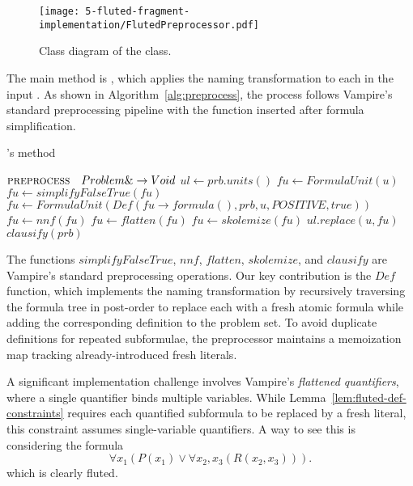 \begin{figure}[H]
  \centering
  \texttt{[image: 5-fluted-fragment-implementation/FlutedPreprocessor.pdf]}
  \caption{Class diagram of the  class.}\label{fig:fluted-preprocessor-class-diagram}
\end{figure}

The main method is , which applies the naming transformation to each  in the input .
As shown in Algorithm~\ref{alg:preprocess}, the process follows Vampire's standard preprocessing pipeline with the  function inserted after formula simplification.

\begin{algorithm}[H]
    \caption{'s  method}\label{alg:preprocess}
    \begin{algorithmic}[1]
        \Statex{}  \(\textsc{preprocess} \quad Problem\& \to Void\)
            \State{} \(ul \gets prb.units()\)
              \State{} \(fu \gets FormulaUnit(u)\)
              \State{} \(fu \gets simplifyFalseTrue(fu)\)
              \State{} \(fu \gets FormulaUnit(Def(fu\to formula(),prb,u,POSITIVE,true))\)
              \State{} \(fu \gets nnf(fu)\)
              \State{} \(fu \gets flatten(fu)\)
              \State{} \(fu \gets skolemize(fu)\)
              \State{} \(ul.replace(u,fu)\)
            \EndFor{}
            \State{} \(clausify(prb)\)
        \EndFunction{}
    \end{algorithmic}
\end{algorithm}

The functions \(simplifyFalseTrue\), \(nnf\), \(flatten\), \(skolemize\), and \(clausify\) are Vampire's standard preprocessing operations.
Our key contribution is the \(Def\) function, which implements the naming transformation by recursively traversing the formula tree in post-order to replace each  with a fresh atomic formula while adding the corresponding definition to the problem set.
To avoid duplicate definitions for repeated subformulae, the preprocessor maintains a memoization map tracking already-introduced fresh literals.

A significant implementation challenge involves Vampire's \emph{flattened quantifiers}, where a single quantifier binds multiple variables.
While Lemma~\ref{lem:fluted-def-constraints} requires each quantified subformula to be replaced by a fresh literal, this constraint assumes single-variable quantifiers.
A way to see this is considering the formula
\[
\forall x_1 (P(x_1) \lor \forall x_2,x_3 (R(x_2,x_3))).
\]
which is clearly fluted.

